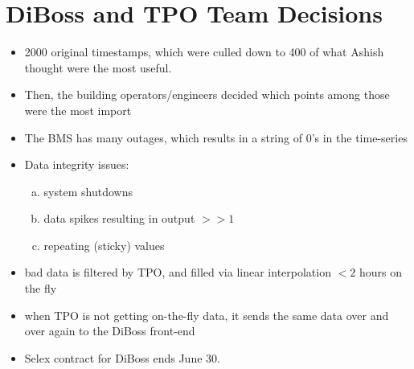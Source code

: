 \documentclass[12pt]{article}
\author{David Karapetyan}
\begin{document}
\section*{DiBoss and TPO Team Decisions}
\begin{itemize}
	\item 2000 original timestamps, which were culled down to 400 of what
		Ashish thought were the most useful.
	\item Then, the building operators/engineers decided which points among
		those were the most import
	\item The BMS has many outages, which results in a string of 0's
		in the time-series
	\item Data integrity issues:
		\begin{enumerate}[(a)]
			\item system shutdowns
			\item data spikes resulting in output $>> 1$
			\item repeating (sticky) values
		\end{enumerate}
	\item bad data is filtered by TPO, and filled via linear interpolation $<2$
		hours on the fly
	\item when TPO is not getting on-the-fly data, it sends the same data
		over and over again to the DiBoss front-end
	\item Selex contract for DiBoss ends June 30.
\end{itemize}
\end{document}
